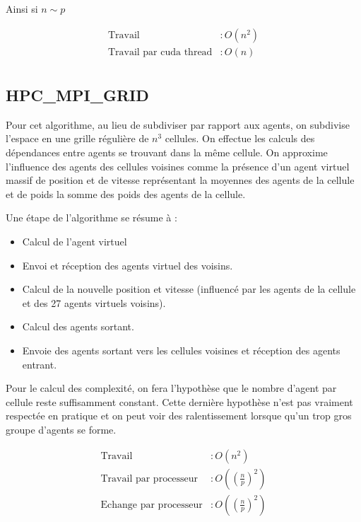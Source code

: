 \documentclass[liens,entete-ensimag,margeCorrection]{ensirapport}
\begin{document}
Ainsi si $n \sim p$

\begin{align*}
    \text{Travail} &: O\left( n^2 \right) \\
    \text{Travail par cuda thread} &: O\left( n \right)  \\
\end{align*}

\subsection{HPC\_MPI\_GRID}

Pour cet algorithme, au lieu de subdiviser par rapport aux agents, on subdivise l'espace en une grille régulière de $n^3$ cellules.
On effectue les calculs des dépendances entre agents se trouvant dans la même cellule.
On approxime l'influence des agents des cellules voisines comme la présence d'un agent virtuel massif de position et de vitesse représentant la moyennes des agents de la cellule et de poids la somme des poids des agents de la cellule.

Une étape de l'algorithme se résume à :
\begin{itemize}
    \item Calcul de l'agent virtuel
    \item Envoi et réception des agents virtuel des voisins.
    \item Calcul de la nouvelle position et vitesse (influencé par les agents de la cellule et des 27 agents virtuels voisins).
    \item Calcul des agents sortant.
    \item Envoie des agents sortant vers les cellules voisines et réception des agents entrant.
\end{itemize}

Pour le calcul des complexité, on fera l'hypothèse que le nombre d'agent par cellule reste suffisamment constant.
Cette dernière hypothèse n'est pas vraiment respectée en pratique et on peut voir des ralentissement lorsque qu'un trop gros groupe d'agents se forme.

\begin{align*}
    \text{Travail} &: O\left( n^2 \right) \\
    \text{Travail par processeur} &: O\left( \left(\frac np \right)^2 \right)  \\
    \text{Echange par processeur} &: O\left( \left(\frac np \right)^2 \right)
\end{align*}
\end{document}
